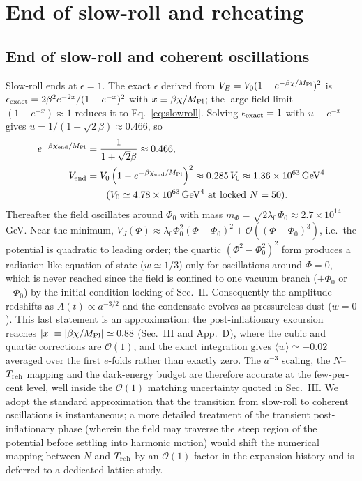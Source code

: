 \documentclass[pdflatex,sn-mathphys-num]{sn-jnl}
\newcommand{\MP}{M_{\rm Pl}}
\newcommand{\PhiV}{\Phi_0}
\theoremstyle{thmstyleone}
\begin{document}
\section{End of slow-roll and reheating}

\subsection{End of slow-roll and coherent oscillations}

Slow-roll ends at $\epsilon=1$. The exact $\epsilon$ derived from $V_E=V_0(1-e^{-\beta\chi/\MP})^2$ is $\epsilon_{\rm exact}=2\beta^2 e^{-2x}/(1-e^{-x})^2$ with $x\equiv\beta\chi/\MP$; the large-field limit $(1-e^{-x})\approx1$ reduces it to Eq.~\eqref{eq:slowroll}. Solving $\epsilon_{\rm exact}=1$ with $u\equiv e^{-x}$ gives $u=1/(1+\sqrt{2}\beta)\approx0.466$, so
\begin{equation}
\begin{aligned}
e^{-\beta\chi_{\rm end}/\MP}&=\frac{1}{1+\sqrt{2}\beta}\approx0.466,\\
V_{\rm end}&=V_0\left(1-e^{-\beta\chi_{\rm end}/\MP}\right)^2\approx0.285\,V_0\approx1.36\times10^{63}\,{\rm GeV}^4\\
&\qquad(V_0\simeq4.78\times10^{63}\,{\rm GeV}^4\ \text{at locked }N=50).
\end{aligned}
\label{eq:Vend}
\end{equation}
Thereafter the field oscillates around $\PhiV$ with mass $m_\Phi=\sqrt{2\lambda_0}\PhiV\approx2.7\times10^{14}\,$GeV. Near the minimum, $V_J(\Phi)\approx\lambda_0\PhiV^2(\Phi-\PhiV)^2+\mathcal{O}((\Phi-\PhiV)^3)$, i.e.\ the potential is quadratic to leading order; the quartic $(\Phi^2-\PhiV^2)^2$ form produces a radiation-like equation of state ($w\simeq1/3$) only for oscillations around $\Phi=0$, which is never reached since the field is confined to one vacuum branch ($+\PhiV$ or $-\PhiV$) by the initial-condition locking of Sec.~II. Consequently the amplitude redshifts as $A(t)\propto a^{-3/2}$ and the condensate evolves as pressureless dust ($w=0$). This last statement is an approximation: the post-inflationary excursion reaches $|x|\equiv|\beta\chi/\MP|\simeq0.88$ (Sec.~III and App.~D), where the cubic and quartic corrections are $\mathcal{O}(1)$, and the exact integration gives $\langle w\rangle\simeq-0.02$ averaged over the first $e$-folds rather than exactly zero. The $a^{-3}$ scaling, the $N$--$T_{\rm reh}$ mapping and the dark-energy budget are therefore accurate at the few-per-cent level, well inside the $\mathcal{O}(1)$ matching uncertainty quoted in Sec.~III. We adopt the standard approximation that the transition from slow-roll to coherent oscillations is instantaneous; a more detailed treatment of the transient post-inflationary phase (wherein the field may traverse the steep region of the potential before settling into harmonic motion) would shift the numerical mapping between $N$ and $T_{\rm reh}$ by an $\mathcal{O}(1)$ factor in the expansion history and is deferred to a dedicated lattice study.
\end{document}
